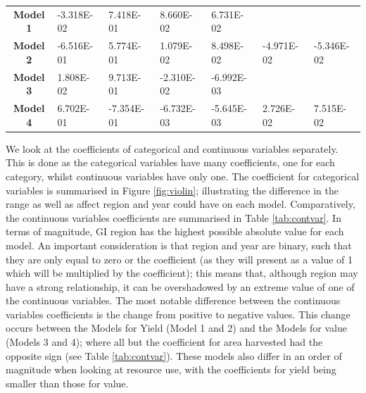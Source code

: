 \documentclass[review,12pt,authoryear]{elsarticle}
\begin{document}
\begin{linenumbers}
\begin{table}[]
{\begin{tabular}{@{}cllllll@{}}
  \textbf{Model 1} & -3.318E-02 & 7.418E-01 & 8.660E-02 & 6.731E-02 &  &  \\
  \textbf{Model 2} & -6.516E-01 & 5.774E-01 & 1.079E-02 & 8.498E-02 & -4.971E-02 & -5.346E-02 \\
  \textbf{Model 3} & 1.808E-02 & 9.713E-01 & -2.310E-02 & -6.992E-03 &  &  \\
  \textbf{Model 4} & 6.702E-01 & -7.354E-01 & -6.732E-03 & -5.645E-03 & 2.726E-02 & 7.515E-02 \\ \bottomrule
\end{tabular}}
\end{table}
We look at the coefficients of categorical and continuous variables separately. This is done as the categorical variables have many coefficients, one for each category, whilst continuous variables have only one. The coefficient for categorical variables is summarised in Figure \ref{fig:violin}; illustrating the difference in the range as well as affect region and year could have on each model. Comparatively, the continuous variables coefficients are summarised in Table \ref{tab:contvar}.
In terms of magnitude, GI region has the highest possible absolute value for each model. An important consideration is that region and year are binary, such that they are only equal to zero or the coefficient (as they will present as a value of 1 which will be multiplied by the coefficient); this means that, although region may have a strong relationship, it can be overshadowed by an extreme value of one of the continuous variables. The most notable difference between the continuous variables coefficients is the change from positive to negative values. This change occurs between the Models for Yield (Model 1 and 2) and the Models for value (Models 3 and 4); where all but the coefficient for area harvested had the opposite sign (see Table \ref{tab:contvar}). These models also differ in an order of magnitude when looking at resource use, with the coefficients for yield being smaller than those for value. 
%
%
%
%
\begin{figure}

\end{figure}
\end{linenumbers}
\end{document}

